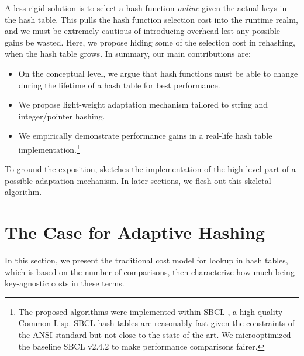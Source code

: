 \documentclass[sigconf]{acmart}
\renewcommand{\label}[1]{%
    \gdef\sfname{sf:##1}}%
\begin{document}
A less rigid solution is to select a hash function \emph{online} given the actual keys in the hash table.
This pulls the hash function selection cost into the runtime realm, and we must be extremely cautious of introducing overhead lest any possible gains be wasted.
Here, we propose hiding some of the selection cost in rehashing, when the hash table grows.
In summary, our main contributions are:
\begin{itemize}
\item On the conceptual level, we argue that hash functions must be able to change during the lifetime of a hash table for best performance.
\item We propose light-weight adaptation mechanism tailored to string and integer/pointer hashing.
\item We empirically demonstrate performance gains in a real-life hash table implementation.\footnote{
The proposed algorithms were implemented within SBCL \citep{newman1999sbcl}, a high-quality Common Lisp.
SBCL hash tables are reasonably fast given the constraints of the ANSI standard \citep{steele1990common} but not close to the state of the art.
We microoptimized the baseline SBCL v2.4.2 to make performance comparisons fairer.}
\end{itemize}

To ground the exposition,  sketches the implementation of the high-level part of a possible adaptation mechanism.
In later sections, we flesh out this skeletal algorithm.

\section{The Case for Adaptive Hashing}
\label{sec:the-case-for-adaptive-hashing}

In this section, we present the traditional cost model for lookup in hash tables, which is based on the number of comparisons, then characterize how much being key-agnostic costs in these terms.
\end{document}
